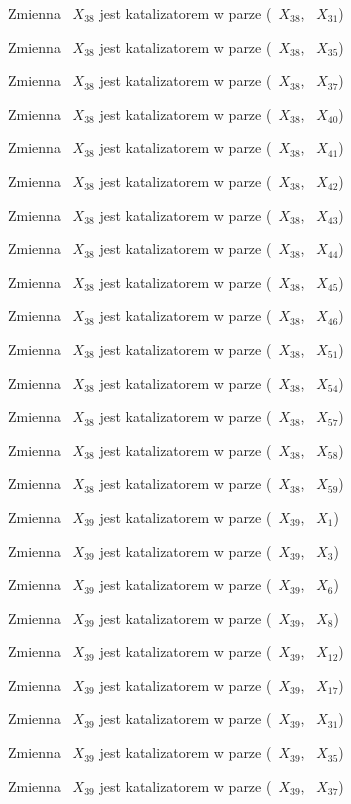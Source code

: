 \documentclass{article}
\begin{document}
Zmienna ~$X_{38}$ jest katalizatorem w parze (~$X_{38}$, ~$X_{31}$)

Zmienna ~$X_{38}$ jest katalizatorem w parze (~$X_{38}$, ~$X_{35}$)

Zmienna ~$X_{38}$ jest katalizatorem w parze (~$X_{38}$, ~$X_{37}$)

Zmienna ~$X_{38}$ jest katalizatorem w parze (~$X_{38}$, ~$X_{40}$)

Zmienna ~$X_{38}$ jest katalizatorem w parze (~$X_{38}$, ~$X_{41}$)

Zmienna ~$X_{38}$ jest katalizatorem w parze (~$X_{38}$, ~$X_{42}$)

Zmienna ~$X_{38}$ jest katalizatorem w parze (~$X_{38}$, ~$X_{43}$)

Zmienna ~$X_{38}$ jest katalizatorem w parze (~$X_{38}$, ~$X_{44}$)

Zmienna ~$X_{38}$ jest katalizatorem w parze (~$X_{38}$, ~$X_{45}$)

Zmienna ~$X_{38}$ jest katalizatorem w parze (~$X_{38}$, ~$X_{46}$)

Zmienna ~$X_{38}$ jest katalizatorem w parze (~$X_{38}$, ~$X_{51}$)

Zmienna ~$X_{38}$ jest katalizatorem w parze (~$X_{38}$, ~$X_{54}$)

Zmienna ~$X_{38}$ jest katalizatorem w parze (~$X_{38}$, ~$X_{57}$)

Zmienna ~$X_{38}$ jest katalizatorem w parze (~$X_{38}$, ~$X_{58}$)

Zmienna ~$X_{38}$ jest katalizatorem w parze (~$X_{38}$, ~$X_{59}$)

Zmienna ~$X_{39}$ jest katalizatorem w parze (~$X_{39}$, ~$X_{1}$)

Zmienna ~$X_{39}$ jest katalizatorem w parze (~$X_{39}$, ~$X_{3}$)

Zmienna ~$X_{39}$ jest katalizatorem w parze (~$X_{39}$, ~$X_{6}$)

Zmienna ~$X_{39}$ jest katalizatorem w parze (~$X_{39}$, ~$X_{8}$)

Zmienna ~$X_{39}$ jest katalizatorem w parze (~$X_{39}$, ~$X_{12}$)

Zmienna ~$X_{39}$ jest katalizatorem w parze (~$X_{39}$, ~$X_{17}$)

Zmienna ~$X_{39}$ jest katalizatorem w parze (~$X_{39}$, ~$X_{31}$)

Zmienna ~$X_{39}$ jest katalizatorem w parze (~$X_{39}$, ~$X_{35}$)

Zmienna ~$X_{39}$ jest katalizatorem w parze (~$X_{39}$, ~$X_{37}$)
\end{document}
